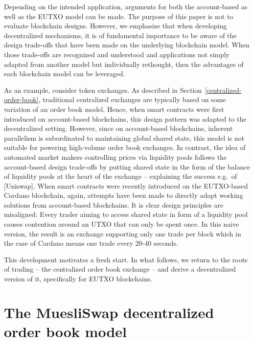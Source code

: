 \documentclass[11pt]{article}
\begin{document}
Depending on the intended application, arguments for both the account-based as well as the EUTXO model can be made. The purpose of this paper is not to evaluate blockchain designs. However, we emphasize that when developing decentralized mechanisms, it is of fundamental importance to be aware of the design trade-offs that have been made on the underlying blockchain model. When those trade-offs are recognized and understood and applications not simply adapted from another model but individually rethought, then the advantages of each blockchain model can be leveraged.

As an example, consider token exchanges. As described in Section~\ref{centralized-order-book}, traditional centralized exchanges are typically based on some variation of an order book model. Hence, when smart contracts were first introduced on account-based blockchains, this design pattern was adapted to the decentralized setting. However, since on account-based blockchains, inherent parallelism is subordinated to maintaining global shared state, this model is not suitable for powering high-volume order book exchanges. In contrast, the idea of automated market makers controlling prices via liquidity pools follows the account-based design trade-offs by putting shared state in the form of the balance of liquidity pools at the heart of the exchange -- explaining the success e.g.\ of [Uniswap]. When smart contracts were recently introduced on the EUTXO-based Cardano blockchain, again, attempts have been made to directly adapt working solutions from account-based blockchains. It is clear design principles are misaligned: Every trader aiming to access shared state in form of a liquidity pool causes contention around an UTXO that can only be spent once. In this naive version, the result is an exchange supporting only one trade per block which in the case of Cardano means one trade every 20-40 seconds.

This development motivates a fresh start. In what follows, we return to the roots of trading -- the centralized order book exchange -- and derive a decentralized version of it, specifically for EUTXO blockchains.


\section{The MuesliSwap decentralized order book model}\label{decentralized-order-book}
\end{document}
